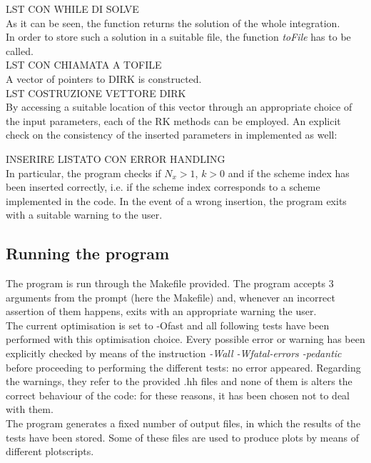 \documentclass[11pt]{article}
\theoremstyle{theorem}
\theoremstyle{definition}
\begin{document}
LST CON WHILE DI SOLVE\\

As it can be seen, the function returns the solution of the whole integration.\\
In order to store such a solution in a suitable file, the function \emph{toFile} has to be called.\\

LST CON CHIAMATA A TOFILE\\

A vector of pointers to DIRK is constructed.\\

LST COSTRUZIONE VETTORE DIRK\\

By accessing a suitable location of this vector through an appropriate choice of the input parameters, each of the RK methods can be employed. An explicit check on the consistency of the inserted parameters in implemented as well:

INSERIRE LISTATO CON ERROR HANDLING\\

In particular, the program checks if $N_x>1$, $k>0$ and if the scheme index has been inserted correctly, i.e. if the scheme index corresponds to a scheme implemented in the code. In the event of a wrong insertion, the program exits with a suitable warning to the user.\\

\subsection{Running the program}
The program is run through the Makefile provided.
The program accepts 3 arguments from the prompt (here the Makefile) and, whenever an incorrect assertion of them happens, exits with an appropriate warning the user.\\
The current optimisation is set to -Ofast and all following tests have been performed with this optimisation choice. Every possible error or warning has been explicitly checked by means of the instruction \emph{-Wall -Wfatal-errors -pedantic} before proceeding to performing the different tests: no error appeared. Regarding the warnings, they refer to the provided .hh files and none of them is alters the correct behaviour of the code: for these reasons, it has been chosen not to deal with them.\\
The program generates a fixed number of output files, in which the results of the tests have been stored. Some of these files are used to produce plots by means of different plotscripts.\\
\end{document}
